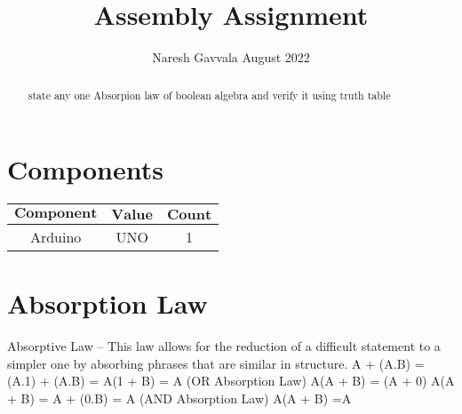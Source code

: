 \documentclass[letterpaper, 10 pt, conference]{ieeeconf}
\title{\LARGE \bf
Assembly Assignment
}
\author{Naresh Gavvala \hspace{9cm} August 2022}
\begin{document}
\maketitle

\begin{abstract}
state any one Absorpion law of boolean algebra and verify it using truth table
\end{abstract}
\tableofcontents

\section{Components}\hfill\break
{
\centering
\begin{tabular}{|c|c|c|}
\hline
$\boldsymbol{Component}$&$\boldsymbol{Value}$&$\boldsymbol{Count}$\\
\hline
Arduino&UNO&1\\
\hline
\end{tabular}\par
}
\vspace{5mm} %
\section{Absorption Law}
Absorptive Law – This law allows for the reduction of a difficult statement to a simpler one by absorbing phrases that are similar in structure. 
A + (A.B) = (A.1) + (A.B) = A(1 + B) = A (OR Absorption Law)
A(A + B) = (A + 0)
A(A + B) = A + (0.B) = A (AND Absorption Law)
A(A + B) =A
\end{document}
